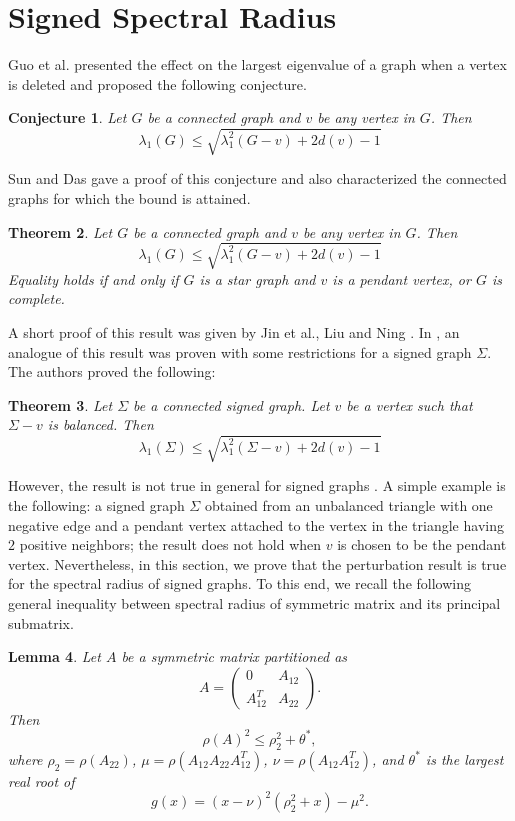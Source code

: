 \documentclass[12pt]{article}
\theoremstyle{plain}
\newtheorem{theorem}{Theorem}[section]
\newtheorem{lemma}[theorem]{Lemma}
\newtheorem{conjecture}[theorem]{Conjecture}
\numberwithin{equation}{section}
\begin{document}
	\section{Signed Spectral Radius}
	Guo et al.\cite{guo2019sharp} presented the effect on the largest eigenvalue of a graph when a vertex is deleted and proposed the following conjecture. 
	\begin{conjecture}\emph{\cite{guo2019sharp}}
		Let $G$ be a connected graph and $v$ be any vertex in $G$. Then 
		$$ \lambda_{1}(G) \leq \sqrt{\lambda_{1}^2(G-v)+2d(v)-1}$$
	\end{conjecture}
	Sun and Das \cite{sun2020conjecture} gave a proof of this conjecture and also characterized the connected graphs for which the bound is attained.
	\begin{theorem}\emph{\cite{sun2020conjecture}}\label{conjec_result}
		Let $G$ be a connected graph and $v$ be any vertex in $G$. Then 
		$$ \lambda_{1}(G) \leq \sqrt{\lambda_{1}^2(G-v)+2d(v)-1}$$
		Equality holds if and only if $G$ is a star graph and $v$ is a pendant vertex, or $G$ is complete.
	\end{theorem}
	A short proof of this result was given by Jin et al.\cite{jin2024upper}, Liu and Ning \cite{MR5098803}. In \cite{lan2023remarks}, an analogue of this result was proven with some restrictions for a signed graph $\Sigma$. The authors proved the following:
	\begin{theorem}\emph{\cite{lan2023remarks}}\label{Remarks_result}
		Let $\Sigma$ be a connected signed graph. Let $v$ be a vertex such that $\Sigma-v$ is balanced. Then $$\lambda_1(\Sigma)\leq \sqrt{\lambda_1^2(\Sigma-v)+2d(v)-1}$$
	\end{theorem}
	However, the result is not true in general for signed graphs \cite{lan2023remarks}. A simple example is the following: a signed graph $\Sigma$ obtained from an unbalanced triangle with one negative edge and a pendant vertex attached to the vertex in the triangle having $2$ positive neighbors; the result does not hold when $v$ is chosen to be the pendant vertex. Nevertheless, in this section, we prove that the perturbation result is true for the spectral radius of signed graphs. To this end, we recall the following general inequality between spectral radius of symmetric matrix and its principal submatrix.
	
	\begin{lemma}\label{Spec_Rad_Sym}\emph{\cite{jin2024upper}}
		Let $A$ be a symmetric matrix partitioned as
		\[
		A=
		\begin{pmatrix}
			0 & A_{12}\\
			A^T_{12} & A_{22}
		\end{pmatrix}.
		\]
		Then
		\[
		\rho(A)^2\le \rho_2^2+\theta^*,
		\]
		where $\rho_2=\rho(A_{22})$, $\mu=\rho(A_{12}A_{22}A^T_{12})$, $\nu=\rho(A_{12}A^T_{12})$, and $\theta^*$ is the largest real root of
		\[
		g(x)=(x-\nu)^2(\rho_2^2+x)-\mu^2.
		\]
	\end{lemma}
	
\end{document}
